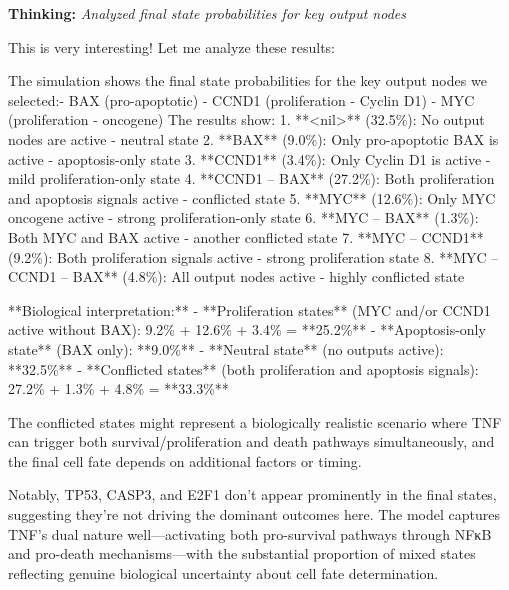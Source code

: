 \documentclass[11pt,a4paper]{article}
\begin{document}
\begin{thinkbox}
\textbf{Thinking:} \textit{Analyzed final state probabilities for key output nodes}

This is very interesting! Let me analyze these results:

The simulation shows the final state probabilities for the key output nodes we selected:- BAX (pro-apoptotic)
- CCND1 (proliferation - Cyclin D1)
- MYC (proliferation - oncogene)  The results show:
1. **<nil>** (32.5\%): No output nodes are active - neutral state
2. **BAX** (9.0\%): Only pro-apoptotic BAX is active - apoptosis-only state
3. **CCND1** (3.4\%): Only Cyclin D1 is active - mild proliferation-only state
4. **CCND1 -- BAX** (27.2\%): Both proliferation and apoptosis signals active - conflicted state
5. **MYC** (12.6\%): Only MYC oncogene active - strong proliferation-only state
6. **MYC -- BAX** (1.3\%): Both MYC and BAX active - another conflicted state
7. **MYC -- CCND1** (9.2\%): Both proliferation signals active - strong proliferation state 
8. **MYC -- CCND1 -- BAX** (4.8\%): All output nodes active - highly conflicted state

**Biological interpretation:**
- **Proliferation states** (MYC and/or CCND1 active without BAX): 9.2\% + 12.6\% + 3.4\% = **25.2\%**
- **Apoptosis-only state** (BAX only): **9.0\%**
- **Neutral state** (no outputs active): **32.5\%**
- **Conflicted states** (both proliferation and apoptosis signals): 27.2\% + 1.3\% + 4.8\% = **33.3\%**

The conflicted states might represent a biologically realistic scenario where TNF can trigger both survival/proliferation and death pathways simultaneously, and the final cell fate depends on additional factors or timing.

Notably, TP53, CASP3, and E2F1 don't appear prominently in the final states, suggesting they're not driving the dominant outcomes here. The model captures TNF's dual nature well—activating both pro-survival pathways through NFκB and pro-death mechanisms—with the substantial proportion of mixed states reflecting genuine biological uncertainty about cell fate determination.

\end{thinkbox}
\end{document}
